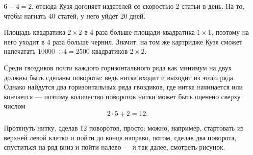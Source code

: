 \begin{itemize}

\itA $6-4=2$, отсюда Кузя догоняет издателей со скоростью 2 статьи в день. На то, чтобы нагнать 40 статей, у него уйдёт 20 дней.

\itB Площадь квадратика $2 \times 2$ в 4 раза больше площади квадратика $1 \times 1$, поэтому на него уходит в 4 раза больше чернил. Значит, на том же картридже Кузя сможет напечатать $10000 \div 4 = 2500$ квадратиков $2 \times 2$.

\itC Среди гвоздиков почти каждого горизонтального ряда как минимум на двух должны быть сделаны повороты: ведь нитка входит и выходит из этого ряда. Однако найдутся два горизонтальных ряда гвоздиков, где нитка начинается или кончается — поэтому количество поворотов нитки может быть оценено сверху числом
$$2 \cdot 5 + 2 =12.$$

\vspace{-0.25cm}
Протянуть нитку, сделав 12 поворотов, просто: можно, например, стартовать из верхней левой клетки и пойти до конца направо, потом, сделав два поворота, спуститься на ряд вниз и пойти налево — и так далее, смотреть рисунок.

\begin{center}  \end{center}

\end{itemize}